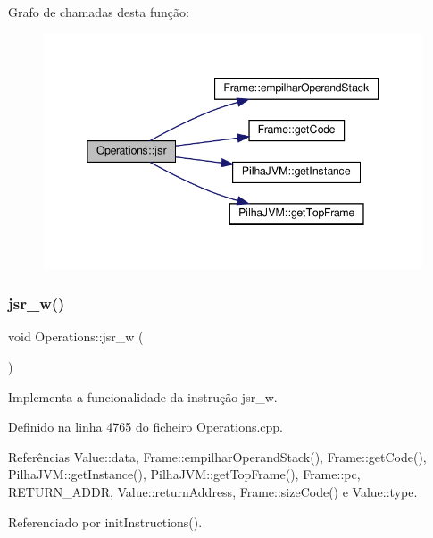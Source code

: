 Grafo de chamadas desta função\+:\nopagebreak
\begin{figure}[H]
\begin{center}
\leavevmode
\includegraphics[width=345pt]{classOperations_a63c3ab8fef60a8a19ee336cb3d86f9aa_cgraph}
\end{center}
\end{figure}
\mbox{\label{classOperations_a22241dabd3678c4ab77bbe5882c3a4db}} 
\subsubsection{\texorpdfstring{jsr\+\_\+w()}{jsr\_w()}}
{\footnotesize\ttfamily void Operations\+::jsr\+\_\+w (\begin{DoxyParamCaption}{ }\end{DoxyParamCaption})\hspace{0.3cm}{\ttfamily [private]}}



Implementa a funcionalidade da instrução jsr\+\_\+w. 



Definido na linha 4765 do ficheiro Operations.\+cpp.



Referências Value\+::data, Frame\+::empilhar\+Operand\+Stack(), Frame\+::get\+Code(), Pilha\+J\+V\+M\+::get\+Instance(), Pilha\+J\+V\+M\+::get\+Top\+Frame(), Frame\+::pc, R\+E\+T\+U\+R\+N\+\_\+\+A\+D\+DR, Value\+::return\+Address, Frame\+::size\+Code() e Value\+::type.



Referenciado por init\+Instructions().

